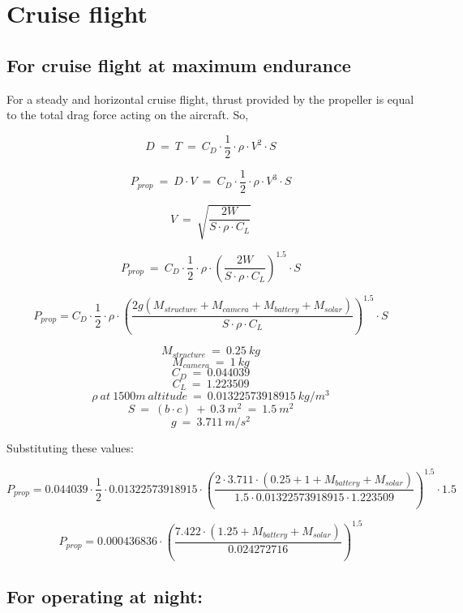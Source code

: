 \chapter{Cruise flight}
\label{chap: Cruise Flight}

\section{For cruise flight at maximum endurance}

\p For a steady and horizontal cruise flight, thrust provided by the propeller is equal to the total drag force acting on the aircraft. So,

\[
D \ = \ T \ = \ C_D \cdot \frac{1}{2} \cdot \rho \cdot V^2 \cdot S
\]

\[
P_{prop} \ = \ D \cdot V \ = \ C_D \cdot \frac{1}{2} \cdot \rho \cdot V^3 \cdot S
\]

\[
V \ = \ \sqrt{\frac{2W}{S \cdot \rho \cdot C_L }}
\]

\[
P_{prop} \ = \  C_D \cdot \frac{1}{2} \cdot \rho \cdot \left(\frac{2W}{S \cdot \rho \cdot C_L }\right)^{1.5} \cdot S
\]



\[
P_{prop} = C_D \cdot \frac{1}{2} \cdot \rho \cdot \left(\frac{2g(M_{structure} + M_{camera} + M_{battery} + M_{solar})}{S \cdot \rho \cdot C_L} \right)^{1.5} \cdot S
\]

\[ M_{structure} \ = \ 0.25 \ kg \]
\[ M_{camera} \ = \ 1 \ kg \]
\[ C_D \ = \ 0.044039 \]
\[ C_L \ = \ 1.223509 \]
\[ \rho \ at \ 1500m \ altitude \ = \ 0.01322573918915 \ kg/m^3 \]
\[S \ = \ ( b \cdot c ) \ + \ 0.3 \ m^2 \ = \ 1.5 \ m^2\]
\[g \ = \ 3.711 \ m/s^2 \]

Substituting these values:

\[
P_{prop} = 0.044039 \cdot \frac{1}{2} \cdot 0.01322573918915 \cdot \left(\frac{2 \cdot 3.711 \cdot (0.25 + 1 + M_{battery} + M_{solar})}{1.5 \cdot 0.01322573918915 \cdot 1.223509} \right)^{1.5} \cdot 1.5
\]


\[
P_{prop} = 0.000436836 \cdot \left(\frac{7.422 \cdot (1.25 + M_{battery} + M_{solar})}{ 0.024272716 } \right)^{1.5}
\]






\section{For operating at night:}


